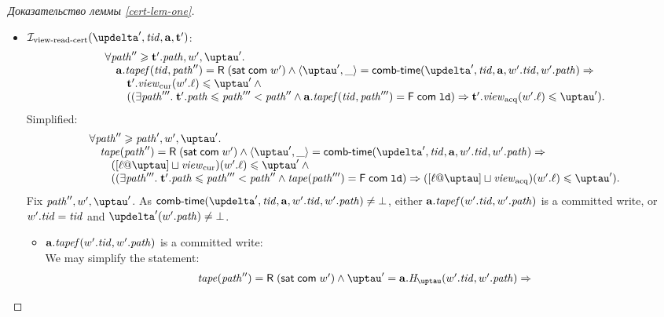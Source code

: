 \begin{proof}[Доказательство леммы \ref{cert-lem-one}]
\begin{itemize}
\begin{itemize}
        \item $\invViewReadCERT(\delta', \tId, \aT, \tT')$: \\
          \[\begin{array}{l}
            \forall \cpath'' \ge \tT'.\cpath, \w', \tau'. \\
            \quad \aT.\tapef(\tId, \cpath'') = \tapeRead{(\tapeSatisfied{\Committed}{\w'})} \land
               \angled{\tau', \_} = \deltaHmap(\delta', \tId, \aT, \w'.\tId, \w'.\cpath) \Rightarrow \\
            \qquad \tT'.\Rcur(\w'.\loc) \le \tau' \land {} \\
            \qquad ((\exists \cpath'''. \; \tT'.\cpath \le \cpath''' < \cpath'' \land 
                         \aT.\tapef(\tId, \cpath''') = \tapeFence{\Committed}{\LD}) \Rightarrow \tT'.\Racq(\w'.\loc) \le \tau'). \\
          \end{array}\]
          Simplified:
          \[\begin{array}{l}
            \forall \cpath'' \ge \cpath', \w', \tau'. \\
            \quad \tape(\cpath'') = \tapeRead{(\tapeSatisfied{\Committed}{\w'})} \land
               \angled{\tau', \_} = \deltaHmap(\delta', \tId, \aT, \w'.\tId, \w'.\cpath) \Rightarrow \\
            \qquad ([\loc @ \tau] \sqcup \Rcur)(\w'.\loc) \le \tau' \land {} \\
            \qquad ((\exists \cpath'''. \; \tT'.\cpath \le \cpath''' < \cpath'' \land 
                         \tape(\cpath''') = \tapeFence{\Committed}{\LD}) \Rightarrow
                         ([\loc @ \tau] \sqcup \Racq)(\w'.\loc) \le \tau'). \\
          \end{array}\]
          Fix $\cpath'', \w', \tau'$.
          As $\deltaHmap(\delta', \tId, \aT, \w'.\tId, \w'.\cpath) \not = \bot$,
          either $\mathbf{a}.\mathit{tapef}(w'.\mathit{tid}, w'.\mathit{path})$ is a committed write, or $w'.\mathit{tid} = \mathit{tid}$ and
          $\delta'(\w'.\cpath) \not = \bot$.
          \begin{itemize}
            \item $\mathbf{a}.\mathit{tapef}(w'.\mathit{tid}, w'.\mathit{path})$ is a committed write: \\
              We may simplify the statement:
          \[\begin{array}{l}
            \tape(\cpath'') = \tapeRead{(\tapeSatisfied{\Committed}{\w'})} \land
               \tau' = \aT.\tmap(\w'.\tId, \w'.\cpath) \Rightarrow \\

\end{array}\]
\end{itemize}
\end{itemize}
\end{itemize}
\end{proof}
